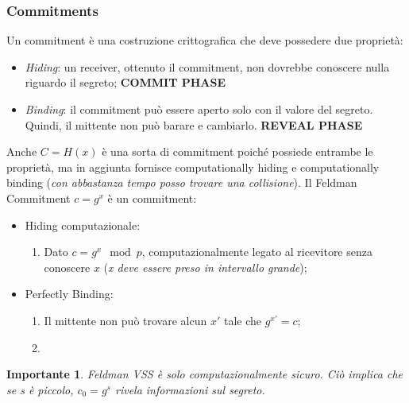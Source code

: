 \documentclass{book}
\newtheorem*{Importante}{\textbf{Importante}}
\begin{document}
\subsubsection{Commitments}
Un commitment è una costruzione crittografica che deve possedere due proprietà:\begin{itemize}
    \item \emph{Hiding}: un receiver, ottenuto il commitment, non dovrebbe conoscere nulla riguardo il segreto; \textbf{COMMIT PHASE}
    \item \emph{Binding}: il commitment può essere aperto solo con il valore del segreto\@. Quindi, il mittente non può barare e cambiarlo. \textbf{REVEAL PHASE}
\end{itemize}
Anche \(C=H(x)\) è una sorta di commitment poiché possiede entrambe le proprietà, ma in aggiunta fornisce computationally hiding e computationally binding (\emph{con abbastanza tempo posso trovare una collisione})\@.\newline
Il Feldman Commitment \(c=g^{x}\) è un commitment:\begin{itemize}
    \item Hiding computazionale:\begin{enumerate}
              \item Dato \(c=g^{x}\mod{p}\), computazionalmente legato al ricevitore senza conoscere \(x\) (\emph{x deve essere preso in intervallo grande});
          \end{enumerate}
    \item Perfectly Binding:\begin{enumerate}
              \item Il mittente non può trovare alcun \(x'\) tale che \(g^{x'}=c\);
              \item
          \end{enumerate}

\end{itemize}
\begin{Importante}
    Feldman VSS è solo computazionalmente sicuro\@. Ciò implica che se s è piccolo, \(c_{0}=g^{s}\) rivela informazioni sul segreto.
\end{Importante}
\end{document}

